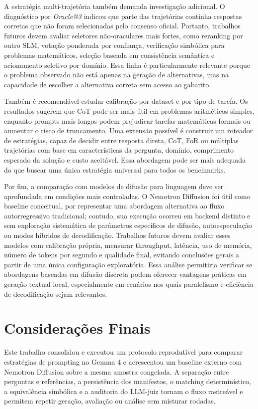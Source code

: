 \documentclass[12pt]{article}
\makeatletter
\newcommand{\oracle}{\mbox{\textit{Oracle@3}}}
\makeatother
\begin{document}
A estratégia multi-trajetória também demanda investigação adicional. O diagnóstico por \oracle{} indicou que parte das trajetórias continha respostas corretas que não foram selecionadas pelo consenso oficial. Portanto, trabalhos futuros devem avaliar seletores não-oraculares mais fortes, como reranking por outro SLM, votação ponderada por confiança, verificação simbólica para problemas matemáticos, seleção baseada em consistência semântica e acionamento seletivo por domínio. Essa linha é particularmente relevante porque o problema observado não está apenas na geração de alternativas, mas na capacidade de escolher a alternativa correta sem acesso ao gabarito.

Também é recomendável estudar calibração por dataset e por tipo de tarefa. Os resultados sugerem que CoT pode ser mais útil em problemas aritméticos simples, enquanto prompts mais longos podem prejudicar tarefas matemáticas formais ou aumentar o risco de truncamento. Uma extensão possível é construir um roteador de estratégias, capaz de decidir entre resposta direta, CoT, FoR ou múltiplas trajetórias com base em características da pergunta, domínio, comprimento esperado da solução e custo aceitável. Essa abordagem pode ser mais adequada do que buscar uma única estratégia universal para todos os benchmarks.

Por fim, a comparação com modelos de difusão para linguagem deve ser aprofundada em condições mais controladas. O Nemotron Diffusion foi útil como baseline conceitual, por representar uma abordagem alternativa ao fluxo autorregressivo tradicional; contudo, sua execução ocorreu em backend distinto e sem exploração sistemática de parâmetros específicos de difusão, autoespeculação ou modos híbridos de decodificação. Trabalhos futuros devem avaliar esses modelos com calibração própria, mensurar throughput, latência, uso de memória, número de tokens por segundo e qualidade final, evitando conclusões gerais a partir de uma única configuração exploratória. Essa análise permitiria verificar se abordagens baseadas em difusão discreta podem oferecer vantagens práticas em geração textual local, especialmente em cenários nos quais paralelismo e eficiência de decodificação sejam relevantes.

\section{Considerações Finais}

Este trabalho consolidou e executou um protocolo reprodutível para comparar estratégias de prompting no Gemma 4 e acrescentou um baseline externo com Nemotron Diffusion sobre a mesma amostra congelada. A separação entre perguntas e referências, a persistência dos manifestos, o matching determinístico, a equivalência simbólica e a auditoria do LLM-juiz tornam o fluxo rastreável e permitem repetir geração, avaliação ou análise sem misturar rodadas.
\end{document}
